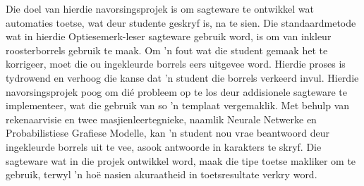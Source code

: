 
\begin{uittreksel}    %
Die doel van hierdie navorsingsprojek is om sagteware te ontwikkel wat automaties toetse, wat deur studente geskryf is, na te sien. Die standaardmetode wat in hierdie Optiesemerk-leser sagteware gebruik word, is om van inkleur roosterborrels gebruik te maak. Om 'n fout wat die student gemaak het te korrigeer, moet die ou ingekleurde borrels eers uitgevee word. Hierdie proses is tydrowend en verhoog die kanse dat 'n student die borrels verkeerd invul. Hierdie navorsingsprojek poog om di\'e probleem op te los deur addisionele sagteware te implementeer, wat die gebruik van so 'n templaat vergemaklik. Met behulp van rekenaarvisie en twee masjienleertegnieke, naamlik Neurale Netwerke en Probabilistiese Grafiese Modelle, kan 'n student nou vrae beantwoord deur ingekleurde borrels uit te vee, asook antwoorde in karakters te skryf.  Die sagteware wat in die projek ontwikkel word, maak die tipe toetse makliker om te gebruik, terwyl 'n ho\"e nasien akuraatheid in toetsresultate verkry word.
\end{uittreksel}
